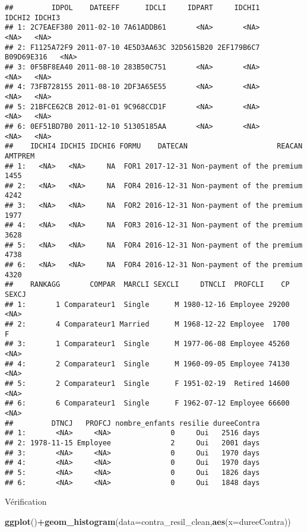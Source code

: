 \documentclass[
]{article}
\newenvironment{Shaded}{\begin{snugshade}}{\end{snugshade}}
\newcommand{\DataTypeTok}[1]{\textcolor[rgb]{0.13,0.29,0.53}{#1}}
\newcommand{\KeywordTok}[1]{\textcolor[rgb]{0.13,0.29,0.53}{\textbf{#1}}}
\newcommand{\NormalTok}[1]{#1}
\newcommand{\OperatorTok}[1]{\textcolor[rgb]{0.81,0.36,0.00}{\textbf{#1}}}
\begin{document}
\begin{verbatim}
##         IDPOL    DATEEFF      IDCLI     IDPART     IDCHI1     IDCHI2 IDCHI3
## 1: 2C7EAEF380 2011-02-10 7A61ADDB61       <NA>       <NA>       <NA>   <NA>
## 2: F1125A72F9 2011-07-10 4E5D3AA63C 32D5615B20 2EF179B6C7 B09D69E316   <NA>
## 3: 0F5BF8EA40 2011-08-10 283B50C751       <NA>       <NA>       <NA>   <NA>
## 4: 73FB728155 2011-08-10 2DF3A65E55       <NA>       <NA>       <NA>   <NA>
## 5: 21BFCE62CB 2012-01-01 9C968CCD1F       <NA>       <NA>       <NA>   <NA>
## 6: 0EF51BD7B0 2011-12-10 51305185AA       <NA>       <NA>       <NA>   <NA>
##    IDCHI4 IDCHI5 IDCHI6 FORMU    DATECAN                     REACAN AMTPREM
## 1:   <NA>   <NA>     NA  FOR1 2017-12-31 Non-payment of the premium    1455
## 2:   <NA>   <NA>     NA  FOR4 2016-12-31 Non-payment of the premium    4242
## 3:   <NA>   <NA>     NA  FOR2 2016-12-31 Non-payment of the premium    1977
## 4:   <NA>   <NA>     NA  FOR3 2016-12-31 Non-payment of the premium    3628
## 5:   <NA>   <NA>     NA  FOR4 2016-12-31 Non-payment of the premium    4738
## 6:   <NA>   <NA>     NA  FOR4 2016-12-31 Non-payment of the premium    4320
##    RANKAGG       COMPAR  MARCLI SEXCLI     DTNCLI  PROFCLI    CP SEXCJ
## 1:       1 Comparateur1  Single      M 1980-12-16 Employee 29200  <NA>
## 2:       4 Comparateur1 Married      M 1968-12-22 Employee  1700     F
## 3:       1 Comparateur1  Single      M 1977-06-08 Employee 45260  <NA>
## 4:       2 Comparateur1  Single      M 1960-09-05 Employee 74130  <NA>
## 5:       2 Comparateur1  Single      F 1951-02-19  Retired 14600  <NA>
## 6:       6 Comparateur1  Single      F 1962-07-12 Employee 66600  <NA>
##         DTNCJ   PROFCJ nombre_enfants resilie dureeContra
## 1:       <NA>     <NA>              0     Oui   2516 days
## 2: 1978-11-15 Employee              2     Oui   2001 days
## 3:       <NA>     <NA>              0     Oui   1970 days
## 4:       <NA>     <NA>              0     Oui   1970 days
## 5:       <NA>     <NA>              0     Oui   1826 days
## 6:       <NA>     <NA>              0     Oui   1848 days
\end{verbatim}

Vérification

\begin{Shaded}
\begin{Highlighting}[]
\KeywordTok{ggplot}\NormalTok{()}\OperatorTok{+}\KeywordTok{geom_histogram}\NormalTok{(}\DataTypeTok{data=}\NormalTok{contra_resil_clean,}\KeywordTok{aes}\NormalTok{(}\DataTypeTok{x=}\NormalTok{dureeContra))}
\end{Highlighting}
\end{Shaded}
\end{document}
